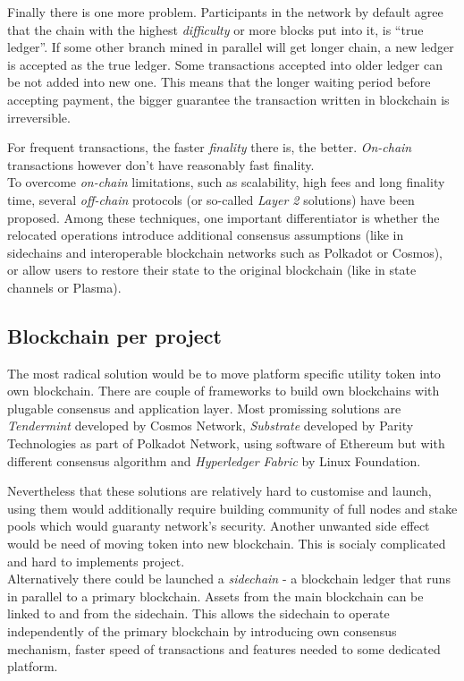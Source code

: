 \documentclass[a4paper,12pt]{article}
\begin{document}
Finally there is one more problem. Participants in the network by default agree 
that the chain with the highest \textit{difficulty} or more blocks put into it, 
is “true ledger”. If some other branch mined in parallel will get longer chain, 
a new ledger is accepted as the true ledger. Some transactions accepted into 
older ledger can be not added into new one. This means that the longer waiting 
period before accepting payment, the bigger guarantee the transaction written 
in blockchain is irreversible.

For frequent transactions, the faster \textit{finality} there is, the better. 
\textit{On-chain} transactions however don't have reasonably fast finality.\\

To overcome \textit{on-chain} limitations, such as scalability, high fees and
long finality time, several \textit{off-chain} protocols (or so-called 
\textit{Layer 2} solutions) have been proposed. Among these techniques, one 
important differentiator is whether the relocated operations introduce 
additional consensus assumptions (like in sidechains and interoperable 
blockchain networks such as Polkadot or Cosmos), or allow users to restore their
state to the original blockchain (like in state channels or Plasma).

\subsection{Blockchain per project}

The most radical solution would be to move platform specific utility token into 
own blockchain. There are couple of frameworks to build own blockchains with 
plugable consensus and application layer. Most promissing solutions are 
\textit{Tendermint} developed by Cosmos Network, \textit{Substrate} developed
by Parity Technologies as part of Polkadot Network, using software of Ethereum
but with different consensus algorithm and \textit{Hyperledger Fabric} by Linux
Foundation.

Nevertheless that these solutions are relatively hard to customise and launch, 
using them would additionally require building community of full nodes and stake 
pools which would guaranty network's security. Another unwanted side effect 
would be need of moving token into new blockchain. This is socialy complicated 
and hard to implements project. \\

Alternatively there could be launched a \textit{sidechain} - a blockchain ledger 
that runs in parallel to a primary blockchain. Assets from the main blockchain 
can be linked to and from the sidechain. This allows the sidechain to operate 
independently of the primary blockchain by introducing own consensus mechanism, 
faster speed of transactions and features needed to some dedicated platform.
\end{document}
